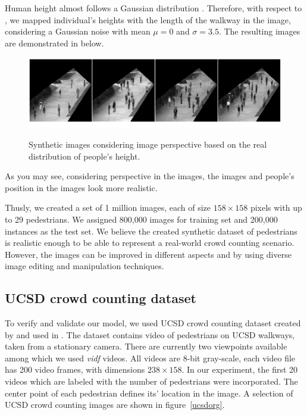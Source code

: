 \begin{itemize}
Human height almost follows a Gaussian distribution \cite{subramanian2011height}. Therefore, with respect to \cite{subramanian2011height, garcia2007evolution}, we mapped individual's heights with the length of the walkway in the image, considering a Gaussian noise with mean $\mu = 0$ and $\sigma = 3.5$. The resulting images are demonstrated in below.

\begin{figure}[H]
	\centering
	{\includegraphics[width=1\textwidth]{images/pers}}
	\caption{Synthetic images considering image perspective based on the real distribution of people's height.}
	\label{fig:pers}
\end{figure}

As you may see, considering perspective in the images, the images and people's position in the images look more realistic. 
\end{itemize}

\noindent Thusly, we created a set of 1 million images, each of size $158\times158$ pixels with up to 29 pedestrians. We assigned 800,000 images for training set and 200,000 instances as the test set. We believe the created synthetic dataset of pedestrians is realistic enough to be able to represent a real-world crowd counting scenario. However, the images can be improved in different aspects and by using diverse image editing and manipulation techniques. 

\subsection{UCSD crowd counting dataset}
\label{subsec:datareal2}
To verify and validate our model, we used UCSD crowd counting dataset created by \citeauthor*{chan2008privacy} and used in \cite{chan2008privacy,chan2009bayesian,chan2012counting}. The dataset contains video of pedestrians on UCSD walkways, taken from a stationary camera. There are currently two  viewpoints available among which we used \textit{vidf} videos. All videos are 8-bit gray-scale, each video file has 200 video frames, with dimensions $238\times158$. In our experiment, the first 20 videos which are labeled with the number of pedestrians were incorporated. The center point of each pedestrian defines its' location in the image. A selection of UCSD crowd counting images are shown in figure~\ref{ucsdorg}.

